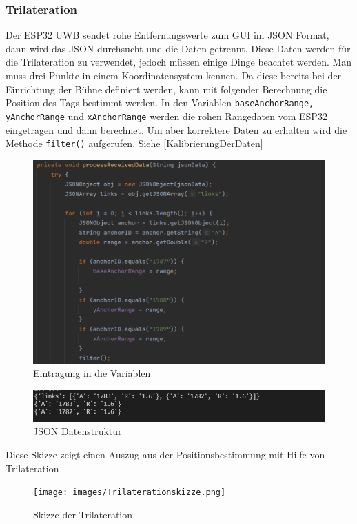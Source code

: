 \subsubsection{Trilateration}

 Der ESP32 UWB sendet rohe Entfernungswerte zum GUI im JSON Format, dann wird das JSON durchsucht und die Daten getrennt. Diese Daten werden für die Trilateration zu verwendet, jedoch müssen einige Dinge beachtet werden. Man muss drei Punkte in einem Koordinatensystem kennen. Da diese bereits bei der Einrichtung der Bühne definiert werden, kann mit folgender Berechnung die Position des Tags bestimmt werden. In den Variablen \texttt{baseAnchorRange, yAnchorRange} und \texttt{xAnchorRange} werden die rohen Rangedaten vom ESP32 eingetragen und dann berechnet. Um aber korrektere Daten zu erhalten wird die Methode \texttt{filter()} aufgerufen. Siehe \ref{KalibrierungDerDaten}


\begin{figure}[H]
	\centering
	\includegraphics[width=0.9\linewidth]{images/EintragungVariablen.png}
	\caption[EintragungVariablen]{Eintragung in die Variablen}
	\label{fig:Variableneintragung}
\end{figure}

\begin{figure}[H]
	\centering
	\includegraphics[width=0.9\linewidth]{images/JSONData.png}
	\caption[JSONData]{JSON Datenstruktur}
	\label{fig:JSONData}
\end{figure}

Diese Skizze zeigt einen Auszug aus der Positionsbestimmung mit Hilfe von Trilateration
\begin{figure}[H]
	\centering
	\texttt{[image: images/Trilaterationskizze.png]}
	\caption[Trilaterationskizze]{Skizze der Trilateration}
	\label{fig:Trilaterationskizze}
\end{figure}

